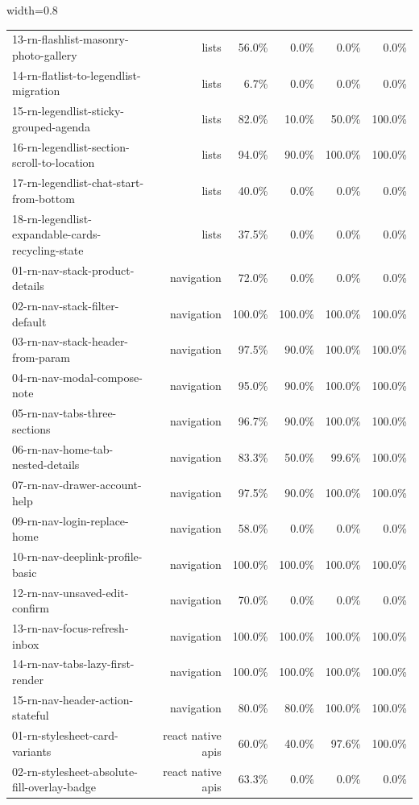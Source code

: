 \begin{table}[htbp]
\begin{adjustbox}{width=0.8\textwidth}
\begin{tabular}{lrrrrr}
13-rn-flashlist-masonry-photo-gallery & lists & 56.0\% & 0.0\% & 0.0\% & 0.0\% \\
14-rn-flatlist-to-legendlist-migration & lists & 6.7\% & 0.0\% & 0.0\% & 0.0\% \\
15-rn-legendlist-sticky-grouped-agenda & lists & 82.0\% & 10.0\% & 50.0\% & 100.0\% \\
16-rn-legendlist-section-scroll-to-location & lists & 94.0\% & 90.0\% & 100.0\% & 100.0\% \\
17-rn-legendlist-chat-start-from-bottom & lists & 40.0\% & 0.0\% & 0.0\% & 0.0\% \\
18-rn-legendlist-expandable-cards-recycling-state & lists & 37.5\% & 0.0\% & 0.0\% & 0.0\% \\
01-rn-nav-stack-product-details & navigation & 72.0\% & 0.0\% & 0.0\% & 0.0\% \\
02-rn-nav-stack-filter-default & navigation & 100.0\% & 100.0\% & 100.0\% & 100.0\% \\
03-rn-nav-stack-header-from-param & navigation & 97.5\% & 90.0\% & 100.0\% & 100.0\% \\
04-rn-nav-modal-compose-note & navigation & 95.0\% & 90.0\% & 100.0\% & 100.0\% \\
05-rn-nav-tabs-three-sections & navigation & 96.7\% & 90.0\% & 100.0\% & 100.0\% \\
06-rn-nav-home-tab-nested-details & navigation & 83.3\% & 50.0\% & 99.6\% & 100.0\% \\
07-rn-nav-drawer-account-help & navigation & 97.5\% & 90.0\% & 100.0\% & 100.0\% \\
09-rn-nav-login-replace-home & navigation & 58.0\% & 0.0\% & 0.0\% & 0.0\% \\
10-rn-nav-deeplink-profile-basic & navigation & 100.0\% & 100.0\% & 100.0\% & 100.0\% \\
12-rn-nav-unsaved-edit-confirm & navigation & 70.0\% & 0.0\% & 0.0\% & 0.0\% \\
13-rn-nav-focus-refresh-inbox & navigation & 100.0\% & 100.0\% & 100.0\% & 100.0\% \\
14-rn-nav-tabs-lazy-first-render & navigation & 100.0\% & 100.0\% & 100.0\% & 100.0\% \\
15-rn-nav-header-action-stateful & navigation & 80.0\% & 80.0\% & 100.0\% & 100.0\% \\
01-rn-stylesheet-card-variants & react native apis & 60.0\% & 40.0\% & 97.6\% & 100.0\% \\
02-rn-stylesheet-absolute-fill-overlay-badge & react native apis & 63.3\% & 0.0\% & 0.0\% & 0.0\% \\

\end{tabular}
\end{adjustbox}
\end{table}
